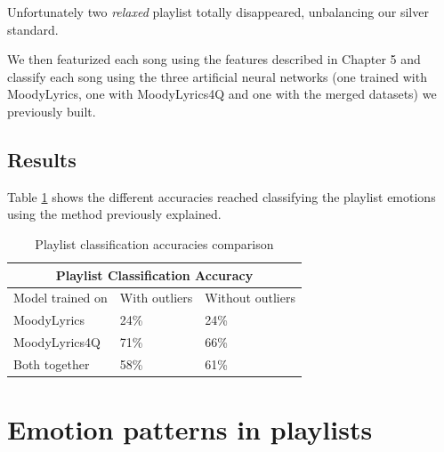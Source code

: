 Unfortunately two \textit{relaxed} playlist totally disappeared, unbalancing our silver standard.\par
We then featurized each song using the features described in Chapter 5 and classify each song using the three artificial neural networks (one trained with MoodyLyrics, one with MoodyLyrics4Q and one with the merged datasets) we previously built.\par

\subsection{Results}
Table \ref{tab:comparison2} shows the different accuracies reached classifying the playlist emotions using the method previously explained. 

\begin{table}[H]
\centering
\begin{tabular}{ |p{3cm}||p{1.5cm}|p{1.5cm}| }
 \hline
 \multicolumn{3}{|c|}{Playlist Classification Accuracy} \\
 \hline
Model trained on & With outliers & Without outliers\\
 \hline
MoodyLyrics & 24\% & 24\%\\
MoodyLyrics4Q  & 71\%    &66\%\\
Both together &   58\%  & 61\%\\
\hline
\end{tabular}
\caption{Playlist classification accuracies comparison} \label{tab:comparison2}
\end{table}

\section{Emotion patterns in playlists}







 
